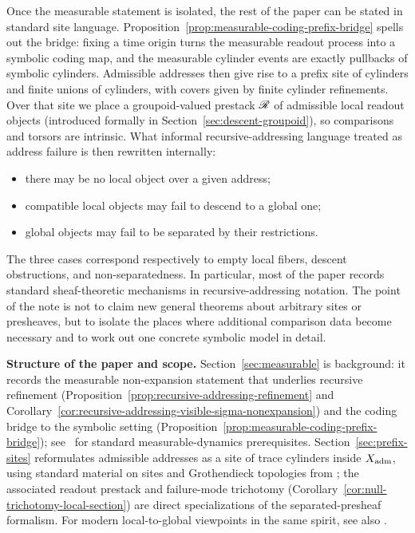 Once the measurable statement is isolated, the rest of the paper can be stated
in standard site language.  Proposition~\ref{prop:measurable-coding-prefix-bridge}
spells out the bridge: fixing a time origin turns the measurable readout
process into a symbolic coding map, and the measurable cylinder events are
exactly pullbacks of symbolic cylinders.  Admissible addresses then give rise
to a prefix site of cylinders and finite unions of cylinders, with covers given
by finite cylinder refinements.  Over that site we place a groupoid-valued
prestack $\mathscr{R}$ of admissible local readout objects (introduced formally in
Section~\ref{sec:descent-groupoid}), so comparisons and torsors are intrinsic.
What informal recursive-addressing language treated as address failure is then
rewritten internally:
\begin{itemize}
\item there may be no local object over a given address;
\item compatible local objects may fail to descend to a global one;
\item global objects may fail to be separated by their restrictions.
\end{itemize}
The three cases correspond respectively to empty local fibers, descent
obstructions, and non-separatedness.  In particular, most of the paper records
standard sheaf-theoretic mechanisms in recursive-addressing notation.  The
point of the note is not to claim new general theorems about arbitrary sites or
presheaves, but to isolate the places where additional comparison data become
necessary and to work out one concrete symbolic model in detail.

\medskip
\noindent\textbf{Structure of the paper and scope.}
Section~\ref{sec:measurable} is background: it records the measurable
non-expansion statement that underlies recursive refinement
(Proposition~\ref{prop:recursive-addressing-refinement} and
Corollary~\ref{cor:recursive-addressing-visible-sigma-nonexpansion}) and the
coding bridge to the symbolic setting
(Proposition~\ref{prop:measurable-coding-prefix-bridge});
see~\cite{WaltersErgodicTheory} for standard measurable-dynamics
prerequisites.  Section~\ref{sec:prefix-sites} reformulates admissible
addresses as a site of trace cylinders inside $X_{\mathrm{adm}}$, using standard material
on sites and Grothendieck topologies from
\cite{MacLaneMoerdijk1992,Johnstone2002Elephant,SGA4I}; the associated readout
prestack and failure-mode trichotomy
(Corollary~\ref{cor:null-trichotomy-local-section}) are direct specializations
of the separated-presheaf formalism.  For modern local-to-global viewpoints in
the same spirit, see also
\cite{AbramskyBrandenburger2011,AbramskyMansfieldBarbosa2012,Curry2014Sheaves,DowlingKaliesVandervorst2023}.

